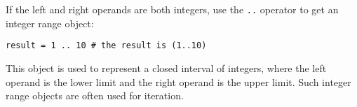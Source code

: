 If the left and right operands are both integers, use the \texttt{..} operator to get an integer range object:
\begin{lstlisting}[language=berry, numbers=none]
result = 1 .. 10 # the result is (1..10)
\end{lstlisting}
This object is used to represent a closed interval of integers, where the left operand is the lower limit and the right operand is the upper limit. Such integer range objects are often used for iteration.